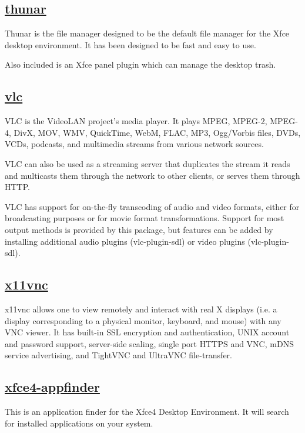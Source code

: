 \subsection{\href{http://thunar.xfce.org}{thunar}}

 Thunar is the file manager designed to be the default file manager for the
 Xfce desktop environment. It has been designed to be fast and easy to use.
 
 Also included is an Xfce panel plugin which can manage the desktop trash.

\subsection{\href{http://www.videolan.org/vlc/}{vlc}}

 VLC is the VideoLAN project's media player. It plays MPEG, MPEG-2, MPEG-4,
 DivX, MOV, WMV, QuickTime, WebM, FLAC, MP3, Ogg/Vorbis files, DVDs, VCDs,
 podcasts, and multimedia streams from various network sources.
 
 VLC can also be used as a streaming server that duplicates the stream it
 reads and multicasts them through the network to other clients, or serves
 them through HTTP.
 
 VLC has support for on-the-fly transcoding of audio and video formats,
 either for broadcasting purposes or for movie format transformations.
 Support for most output methods is provided by this package, but features
 can be added by installing additional audio plugins (vlc-plugin-sdl) or
 video plugins (vlc-plugin-sdl).

\subsection{\href{http://www.karlrunge.com/x11vnc/}{x11vnc}}

 x11vnc allows one to view remotely and interact with real X displays (i.e. a
 display corresponding to a physical monitor, keyboard, and mouse) with any
 VNC viewer. It has built-in SSL encryption and authentication, UNIX account
 and password support, server-side scaling, single port HTTPS and VNC, mDNS
 service advertising, and TightVNC and UltraVNC file-transfer.

\subsection{\href{http://www.xfce.org/}{xfce4-appfinder}}

 This is an application finder for the Xfce4 Desktop Environment.
 It will search for installed applications on your system.


